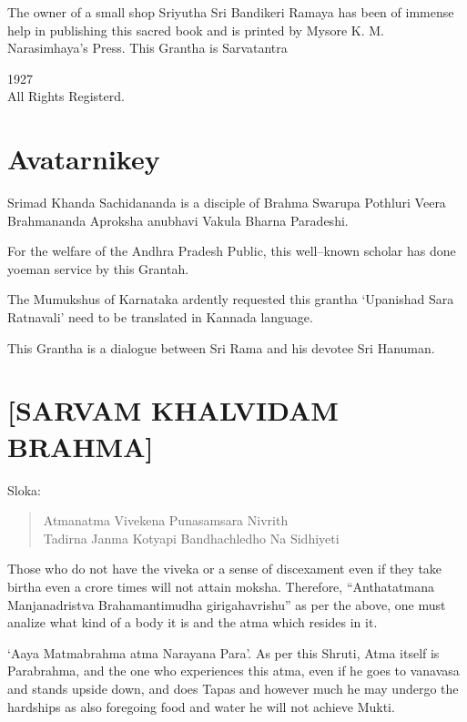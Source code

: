 The owner of a small shop Sriyutha  Sri Bandikeri Ramaya has been of immense help in publishing this sacred book and is printed by Mysore K. M. Narasimhaya's Press. This Grantha is Sarvatantra

\begin{center}
1927\\ All Rights Registerd.
\end{center}

\delimiter

\chapter*{Avatarnikey}

Srimad Khanda Sachidananda is a disciple of Brahma Swarupa Pothluri Veera Brahmananda Aproksha anubhavi Vakula Bharna Paradeshi.

For the welfare of the Andhra Pradesh Public, this well–known scholar has done yoeman service by this Grantah.

The Mumukshus of Karnataka ardently requested this grantha ‘Upanishad Sara Ratnavali’ need to be translated in Kannada language.

This Grantha is a dialogue between Sri Rama and his devotee Sri Hanuman.

\delimiter

\chapter*{[SARVAM KHALVIDAM BRAHMA]}

Sloka:

\begin{verse}
 Atmanatma Vivekena Punasamsara Nivrith \\
 Tadirna Janma Kotyapi Bandhachledho Na Sidhiyeti 
\end{verse}

Those who do not have the viveka or a sense of discexament even if they take birtha even a crore times will not attain moksha. Therefore, “Anthatatmana Manjanadristva  Brahamantimudha girigahavrishu” as per the above, one must analize what kind of a body it is and the atma which resides in it.

‘Aaya Matmabrahma  atma Narayana Para’. As per this Shruti, Atma itself is Parabrahma, and the one who experiences this atma, even if he goes to vanavasa and stands upside down, and does Tapas and however much he may undergo the hardships as also foregoing food and water he will not achieve Mukti.

